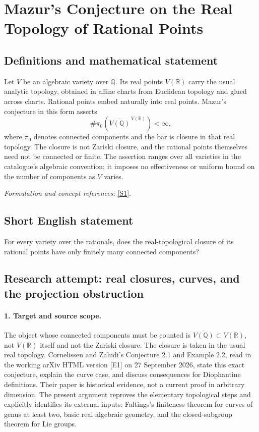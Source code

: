 \documentclass[11pt]{article}
\begin{document}
\section*{\texorpdfstring{Mazur's Conjecture on the Real Topology of Rational Points}{Mazur's Conjecture on the Real Topology of Rational Points}}\label{346}
\subsection{Definitions and mathematical statement}
Let $V$ be an algebraic variety over ${\mathbb{Q}}$. Its real points $V({\mathbb{R}})$ carry the usual analytic topology, obtained in affine charts from Euclidean topology and glued across charts. Rational points embed naturally into real points. Mazur's conjecture in this form asserts
\[
 \#\pi_0\!\left(\overline{V({\mathbb{Q}})}^{\,V({\mathbb{R}})}\right)<\infty,
\]
where $\pi_0$ denotes connected components and the bar is closure in that real topology. The closure is not Zariski closure, and the rational points themselves need not be connected or finite. The assertion ranges over all varieties in the catalogue's algebraic convention; it imposes no effectiveness or uniform bound on the number of components as $V$ varies.
\par\smallskip\textit{Formulation and concept references:} \href{https://ar5iv.labs.arxiv.org/html/math/0006140}{[S1]}.

\subsection{Short English statement}
For every variety over the rationals, does the real-topological closure of its rational points have only finitely many connected components?
\subsection{Research attempt: real closures, curves, and the projection obstruction}
\paragraph{1. Target and source scope.}
The object whose connected components must be counted is $\overline{V(\mathbb Q)}\subset V(\mathbb R)$, not $V(\mathbb R)$ itself and not the Zariski closure. The closure is taken in the usual real topology. Cornelissen and Zahidi's Conjecture 2.1 and Example 2.2, read in the working arXiv HTML version [E1] on 27 September 2026, state this exact conjecture, explain the curve case, and discuss consequences for Diophantine definitions. Their paper is historical evidence, not a current proof in arbitrary dimension. The present argument reproves the elementary topological steps and explicitly identifies its external inputs: Faltings's finiteness theorem for curves of genus at least two, basic real algebraic geometry, and the closed-subgroup theorem for Lie groups.
\end{document}
